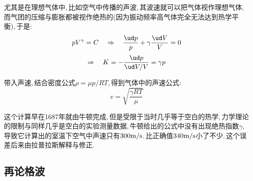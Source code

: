 尤其是在理想气体中,\,比如空气中传播的声波,\,其波速就可以把气体视作理想气体,\,而气团的压缩与膨胀都被视作绝热的(因为振动频率高气体完全无法达到热学平衡),\,于是:
\[pV^\gamma=C\quad\Rightarrow \quad \frac{\ud p}{p}+\gamma\frac{\ud V}{V}=0\]
\[\Rightarrow \quad K=-\frac{\ud p}{\ud V/V}=\gamma p\]

带入声速,\,结合密度公式$\rho=\mu p/RT$,\,得到气体中的声速公式:
\[v=\sqrt{\frac{\gamma RT}{\mu}}\]

这个计算早在1687年就由牛顿完成,\,但是受限于当时几乎等于空白的热学,\,力学理论的限制与同样几乎是空白的实验测量数据,\,牛顿给出的公式中没有出现绝热指数$\gamma$,\,导致它计算出的室温下空气中声速只有$300{\rm m/s}$.\,比正确值$340{\rm m/s}$小了不少.\,这个误差后来由拉普拉斯解释与修正.

\subsection{再论格波}
